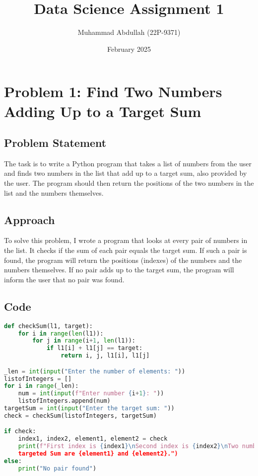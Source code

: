 \documentclass{article}
\title{Data Science Assignment 1}
\author{Muhammad Abdullah (22P-9371)}
\date{February 2025}
\begin{document}
\maketitle
\section{Problem 1: Find Two Numbers Adding Up to a Target Sum}
\subsection{Problem Statement}
The task is to write a Python program that takes a list of numbers from the user and finds two numbers in the list that add up to a target sum, also provided by the user. The program should then return the positions of the two numbers in the list and the numbers themselves.

\subsection{Approach}
To solve this problem, I wrote a program that looks at every pair of numbers in the list. It checks if the sum of each pair equals the target sum. If such a pair is found, the program will return the positions (indexes) of the numbers and the numbers themselves. If no pair adds up to the target sum, the program will inform the user that no pair was found.

\subsection{Code}

\begin{lstlisting}[language=Python]
def checkSum(l1, target):
    for i in range(len(l1)):
        for j in range(i+1, len(l1)):
            if l1[i] + l1[j] == target:
                return i, j, l1[i], l1[j]

_len = int(input("Enter the number of elements: "))  
listofIntegers = []
for i in range(_len):
    num = int(input(f"Enter number {i+1}: "))
    listofIntegers.append(num) 
targetSum = int(input("Enter the target sum: "))
check = checkSum(listofIntegers, targetSum)

if check:
    index1, index2, element1, element2 = check
    print(f"First index is {index1}\nSecond index is {index2}\nTwo numbers that add up the 
    targeted Sum are {element1} and {element2}.")
else:
    print("No pair found")
\end{lstlisting}
\end{document}

